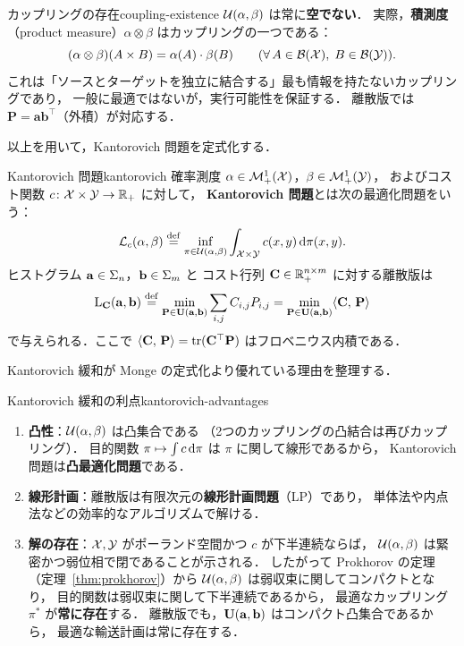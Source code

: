 \begin{remark}{カップリングの存在}{coupling-existence}
  $\mathcal{U}(\alpha, \beta)$ は常に\textbf{空でない}．
  実際，\textbf{積測度}（product measure）$\alpha \otimes \beta$ はカップリングの一つである：
  \[
    (\alpha \otimes \beta)(A \times B) = \alpha(A) \cdot \beta(B)
    \qquad (\forall\, A \in \mathcal{B}(\mathcal{X}), \; B \in \mathcal{B}(\mathcal{Y})).
  \]
  これは「ソースとターゲットを独立に結合する」最も情報を持たないカップリングであり，
  一般に最適ではないが，実行可能性を保証する．
  離散版では $\mathbf{P} = \mathbf{a} \mathbf{b}^\top$（外積）が対応する．
\end{remark}

以上を用いて，Kantorovich 問題を定式化する．

\begin{setting}{Kantorovich 問題}{kantorovich}
  確率測度 $\alpha \in \mathcal{M}_+^1(\mathcal{X})$，$\beta \in \mathcal{M}_+^1(\mathcal{Y})$，
  およびコスト関数 $c \colon \mathcal{X} \times \mathcal{Y} \to \mathbb{R}_+$ に対して，
  \textbf{Kantorovich 問題}とは次の最適化問題をいう：
  \[
    \mathcal{L}_c(\alpha, \beta) \overset{\mathrm{def}}{=}
    \inf_{\pi \in \mathcal{U}(\alpha, \beta)}
    \int_{\mathcal{X} \times \mathcal{Y}} c(x, y) \, \mathrm{d}\pi(x, y).
  \]
  ヒストグラム $\mathbf{a} \in \Sigma_n$，$\mathbf{b} \in \Sigma_m$ と
  コスト行列 $\mathbf{C} \in \mathbb{R}_+^{n \times m}$ に対する離散版は
  \[
    \mathrm{L}_{\mathbf{C}}(\mathbf{a}, \mathbf{b}) \overset{\mathrm{def}}{=}
    \min_{\mathbf{P} \in \mathbf{U}(\mathbf{a}, \mathbf{b})}
    \sum_{i,j} C_{i,j} P_{i,j}
    = \min_{\mathbf{P} \in \mathbf{U}(\mathbf{a}, \mathbf{b})}
    \langle \mathbf{C},\, \mathbf{P} \rangle
  \]
  で与えられる．ここで $\langle \mathbf{C},\, \mathbf{P} \rangle = \operatorname{tr}(\mathbf{C}^\top \mathbf{P})$
  はフロベニウス内積である．
\end{setting}

Kantorovich 緩和が Monge の定式化より優れている理由を整理する．

\begin{remark}{Kantorovich 緩和の利点}{kantorovich-advantages}
  \begin{enumerate}
    \item \textbf{凸性}：$\mathcal{U}(\alpha, \beta)$ は凸集合である
      （2つのカップリングの凸結合は再びカップリング）．
      目的関数 $\pi \mapsto \int c \, \mathrm{d}\pi$ は $\pi$ に関して線形であるから，
      Kantorovich 問題は\textbf{凸最適化問題}である．
    \item \textbf{線形計画}：離散版は有限次元の\textbf{線形計画問題}（LP）であり，
      単体法や内点法などの効率的なアルゴリズムで解ける．
    \item \textbf{解の存在}：$\mathcal{X}, \mathcal{Y}$ がポーランド空間かつ $c$ が下半連続ならば，
      $\mathcal{U}(\alpha, \beta)$ は緊密かつ弱位相で閉であることが示される．
      したがって Prokhorov の定理（定理~\ref{thm:prokhorov}）から
      $\mathcal{U}(\alpha, \beta)$ は弱収束に関してコンパクトとなり，
      目的関数は弱収束に関して下半連続であるから，
      最適なカップリング $\pi^*$ が\textbf{常に存在}する．
      離散版でも，$\mathbf{U}(\mathbf{a}, \mathbf{b})$ はコンパクト凸集合であるから，
      最適な輸送計画は常に存在する．
  \end{enumerate}
\end{remark}

